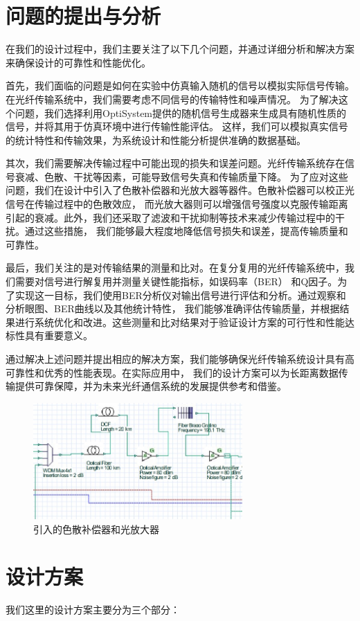 \documentclass[12pt]{article}
\begin{document}
\section{问题的提出与分析}
在我们的设计过程中，我们主要关注了以下几个问题，并通过详细分析和解决方案来确保设计的可靠性和性能优化。

首先，我们面临的问题是如何在实验中仿真输入随机的信号以模拟实际信号传输。在光纤传输系统中，我们需要考虑不同信号的传输特性和噪声情况。
为了解决这个问题，我们选择利用OptiSystem提供的随机信号生成器来生成具有随机性质的信号，并将其用于仿真环境中进行传输性能评估。
这样，我们可以模拟真实信号的统计特性和传输效果，为系统设计和性能分析提供准确的数据基础。

其次，我们需要解决传输过程中可能出现的损失和误差问题。光纤传输系统存在信号衰减、色散、干扰等因素，可能导致信号失真和传输质量下降。
为了应对这些问题，我们在设计中引入了色散补偿器和光放大器等器件。色散补偿器可以校正光信号在传输过程中的色散效应，
而光放大器则可以增强信号强度以克服传输距离引起的衰减。此外，我们还采取了滤波和干扰抑制等技术来减少传输过程中的干扰。通过这些措施，
我们能够最大程度地降低信号损失和误差，提高传输质量和可靠性。

最后，我们关注的是对传输结果的测量和比对。在复分复用的光纤传输系统中，我们需要对信号进行解复用并测量关键性能指标，如误码率（BER） 
\cite{enwiki:1158016020}和Q因子\cite{HICKMAN199025}。为了实现这一目标，我们使用BER分析仪对输出信号进行评估和分析。通过观察和分析眼图、BER曲线以及其他统计特性，
我们能够准确评估传输质量，并根据结果进行系统优化和改进。这些测量和比对结果对于验证设计方案的可行性和性能达标性具有重要意义。

通过解决上述问题并提出相应的解决方案，我们能够确保光纤传输系统设计具有高可靠性和优秀的性能表现。在实际应用中，
我们的设计方案可以为长距离数据传输提供可靠保障，并为未来光纤通信系统的发展提供参考和借鉴。
\begin{figure}[htbp]
	\centering
	\includegraphics[width=8cm]{figure2.png}
	\caption{引入的色散补偿器和光放大器}
\end{figure}
\clearpage
\section{设计方案}
我们这里的设计方案主要分为三个部分：
\end{document}
